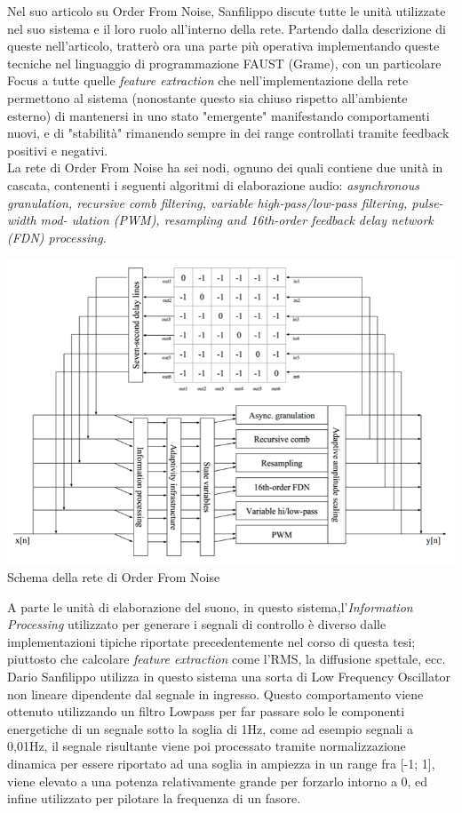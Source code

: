 Nel suo articolo su Order From Noise, Sanfilippo discute tutte le unità utilizzate
nel suo sistema e il loro ruolo all'interno della rete.
Partendo dalla descrizione di queste nell'articolo, tratterò ora una parte più operativa 
implementando queste tecniche nel linguaggio di programmazione FAUST (Grame), 
con un particolare Focus a tutte quelle \textit{feature extraction}
che nell'implementazione della rete permettono al sistema 
(nonostante questo sia chiuso rispetto all'ambiente esterno) 
di mantenersi in uno stato "emergente" manifestando comportamenti nuovi,
e di "stabilità" rimanendo sempre in dei range controllati tramite feedback positivi e negativi.\\
La rete di Order From Noise ha sei nodi, ognuno dei quali contiene due unità in cascata, 
contenenti i seguenti algoritmi di elaborazione audio: 
\textit{asynchronous granulation, recursive comb filtering, variable high-pass/low-pass filtering, pulse-width mod-
ulation (PWM), resampling and 16th-order feedback delay network (FDN) processing.}

\begin{center}
    \includegraphics[width=14cm]{figures/OFNnetwork.pdf} \\
    {Schema della rete di Order From Noise} \\ 
    \end{center}

A parte le unità di elaborazione del suono,
in questo sistema,l'\textit{Information Processing} utilizzato per generare i 
segnali di controllo è diverso
dalle implementazioni tipiche riportate precedentemente nel corso di questa tesi;
piuttosto che calcolare \textit{feature extraction} come l'RMS, la diffusione spettale, ecc. 
Dario Sanfilippo utilizza in questo sistema una sorta di Low Frequency Oscillator
non lineare dipendente dal segnale in ingresso.
Questo comportamento viene ottenuto utilizzando un filtro Lowpass per far 
passare solo le componenti energetiche di un segnale sotto la soglia di 1Hz,
come ad esempio segnali a 0,01Hz, il segnale risultante viene poi processato
tramite normalizzazione dinamica per essere riportato ad una soglia in ampiezza
in un range fra [-1; 1],
viene elevato a una potenza relativamente grande per forzarlo intorno a 0,
ed infine utilizzato per pilotare la frequenza di un fasore.\\

